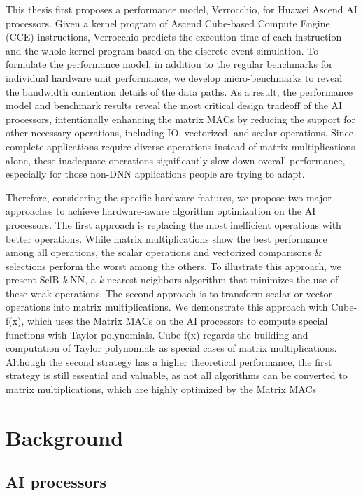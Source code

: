 \documentclass[12pt]{extbook}
\begin{document}
This thesis first proposes a performance model, Verrocchio, for Huawei Ascend AI processors. Given a kernel program of Ascend Cube-based Compute Engine (CCE) instructions, Verrocchio predicts the execution time of each instruction and the whole kernel program based on the discrete-event simulation. To formulate the performance model, in addition to the regular benchmarks for individual hardware unit performance, we develop micro-benchmarks to reveal the bandwidth contention details of the data paths. As a result, the performance model and benchmark results reveal the most critical design tradeoff of the AI processors, intentionally enhancing the matrix MACs by reducing the support for other necessary operations, including IO, vectorized, and scalar operations. Since complete applications require diverse operations instead of matrix multiplications alone, these inadequate operations significantly slow down overall performance, especially for those non-DNN applications people are trying to adapt.

Therefore, considering the specific hardware features, we propose two major approaches to achieve hardware-aware algorithm optimization on the AI processors. The first approach is replacing the most inefficient operations with better operations. While matrix multiplications show the best performance among all operations, the scalar operations and vectorized comparisons \& selections perform the worst among the others. To illustrate this approach, we present SelB-\textit{k}-NN, a \textit{k}-nearest neighbors algorithm that minimizes the use of these weak operations. The second approach is to transform scalar or vector operations into matrix multiplications. We demonstrate this approach with Cube-f(x), which uses the Matrix MACs on the AI processors to compute special functions with Taylor polynomials. Cube-f(x) regards the building and computation of Taylor polynomials as special cases of matrix multiplications. Although the second strategy has a higher theoretical performance, the first strategy is still essential and valuable, as not all algorithms can be converted to matrix multiplications, which are highly optimized by the Matrix MACs


\section{Background}
\label{sec_1_1_background}

\subsection{AI processors}
\end{document}
